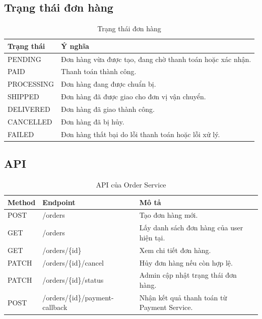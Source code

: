 \documentclass[../main.tex]{subfiles}
\begin{document}
\subsection{Trạng thái đơn hàng}
\label{subsection:2.6.3}

\begin{table}[H]
    \centering
    \caption{Trạng thái đơn hàng}
    \label{tab:chapter2-order-status}
    \begin{tabular}{|p{}|p{}|}
        \hline
        \rowcolor{primary!35}
        \textbf{Trạng thái} & \textbf{Ý nghĩa} \\
        \hline
        PENDING & Đơn hàng vừa được tạo, đang chờ thanh toán hoặc xác nhận. \\
        \hline
        PAID & Thanh toán thành công. \\
        \hline
        PROCESSING & Đơn hàng đang được chuẩn bị. \\
        \hline
        SHIPPED & Đơn hàng đã được giao cho đơn vị vận chuyển. \\
        \hline
        DELIVERED & Đơn hàng đã giao thành công. \\
        \hline
        CANCELLED & Đơn hàng đã bị hủy. \\
        \hline
        FAILED & Đơn hàng thất bại do lỗi thanh toán hoặc lỗi xử lý. \\
        \hline
    \end{tabular}
\end{table}

\subsection{API}
\label{subsection:2.6.4}

\begin{table}[H]
    \centering
    \caption{API của Order Service}
    \label{tab:chapter2-order-api}
    \begin{tabular}{|p{}|p{}|p{}|}
        \hline
        \rowcolor{primary!35}
        \textbf{Method} & \textbf{Endpoint} & \textbf{Mô tả} \\
        \hline
        POST & /orders & Tạo đơn hàng mới. \\
        \hline
        GET & /orders & Lấy danh sách đơn hàng của user hiện tại. \\
        \hline
        GET & /orders/\{id\} & Xem chi tiết đơn hàng. \\
        \hline
        PATCH & /orders/\{id\}/cancel & Hủy đơn hàng nếu còn hợp lệ. \\
        \hline
        PATCH & /orders/\{id\}/status & Admin cập nhật trạng thái đơn hàng. \\
        \hline
        POST & /orders/\{id\}/payment-callback & Nhận kết quả thanh toán từ Payment Service. \\
        \hline
    \end{tabular}
\end{table}
\end{document}
